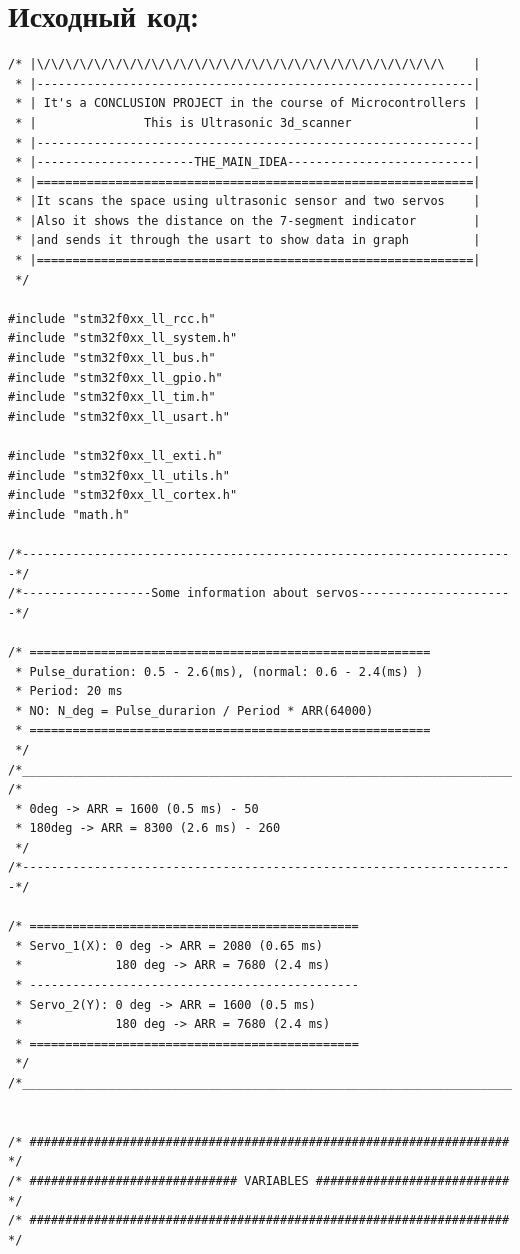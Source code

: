 \documentclass[a4paper, 12pt, twoside]{article}
\begin{document}
\section*{Исходный код:}
\begin{verbatim}
/* |\/\/\/\/\/\/\/\/\/\/\/\/\/\/\/\/\/\/\/\/\/\/\/\/\/\/\/\/\    |
 * |-------------------------------------------------------------|
 * | It's a CONCLUSION PROJECT in the course of Microcontrollers |
 * |               This is Ultrasonic 3d_scanner                 |
 * |-------------------------------------------------------------|
 * |----------------------THE_MAIN_IDEA--------------------------|
 * |=============================================================|
 * |It scans the space using ultrasonic sensor and two servos    |
 * |Also it shows the distance on the 7-segment indicator        |
 * |and sends it through the usart to show data in graph         |
 * |=============================================================|
 */

#include "stm32f0xx_ll_rcc.h"
#include "stm32f0xx_ll_system.h"
#include "stm32f0xx_ll_bus.h"
#include "stm32f0xx_ll_gpio.h"
#include "stm32f0xx_ll_tim.h"
#include "stm32f0xx_ll_usart.h"

#include "stm32f0xx_ll_exti.h"
#include "stm32f0xx_ll_utils.h"
#include "stm32f0xx_ll_cortex.h"
#include "math.h"

/*---------------------------------------------------------------------*/
/*------------------Some information about servos----------------------*/

/* ========================================================
 * Pulse_duration: 0.5 - 2.6(ms), (normal: 0.6 - 2.4(ms) )
 * Period: 20 ms
 * NO: N_deg = Pulse_durarion / Period * ARR(64000)
 * ========================================================
 */ 
/*_____________________________________________________________________*/
/* 
 * 0deg -> ARR = 1600 (0.5 ms) - 50
 * 180deg -> ARR = 8300 (2.6 ms) - 260
 */
/*---------------------------------------------------------------------*/

/* ==============================================
 * Servo_1(X): 0 deg -> ARR = 2080 (0.65 ms) 
 *             180 deg -> ARR = 7680 (2.4 ms)
 * ----------------------------------------------
 * Servo_2(Y): 0 deg -> ARR = 1600 (0.5 ms)
 *             180 deg -> ARR = 7680 (2.4 ms)
 * ==============================================
 */ 
/*_____________________________________________________________________*/


/* ################################################################### */
/* ############################# VARIABLES ########################### */
/* ################################################################### */


\end{verbatim}
\end{document}
